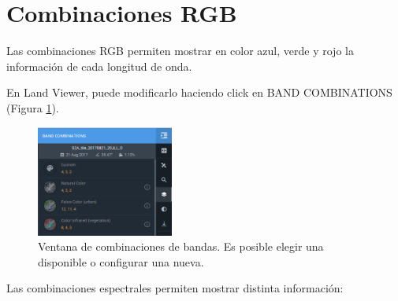 \documentclass[a4paper,12pt]{book}
\begin{document}
\section{Combinaciones RGB}

Las combinaciones RGB permiten mostrar en color azul, verde y rojo la información de cada longitud de onda.

En Land Viewer, puede modificarlo haciendo click en BAND COMBINATIONS (Figura \ref{fig:bandas}).

\begin{figure}[h!]
    \centering
    \includegraphics[width=0.4\textwidth]{fig:bandas.png}
    \caption{Ventana de combinaciones de bandas. Es posible elegir una disponible o configurar una nueva.}
    \label{fig:bandas}
\end{figure}

Las combinaciones espectrales permiten mostrar distinta información:
\end{document}
